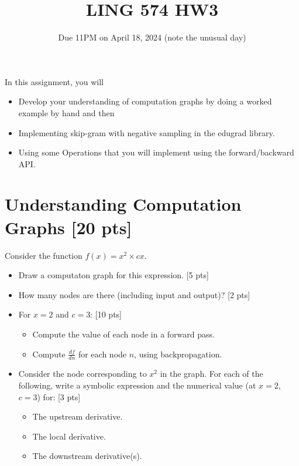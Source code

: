 \documentclass[11pt]{article}
\begin{document}
\title{LING 574 HW3}
\date{\vspace{-0.2in}Due 11PM on April 18, 2024 (note the unusual day)}
\maketitle


\noindent In this assignment, you will 
\begin{itemize}
  \item Develop your understanding of computation graphs by doing a worked example by hand and then
  \item Implementing skip-gram with negative sampling in the edugrad library.
  \item Using some Operations that you will implement using the forward/backward API.
\end{itemize}


\section{Understanding Computation Graphs [20 pts]}

  Consider the function $f(x) = x^2 \times cx$.
\begin{itemize}
  \item Draw a computaton graph for this expression. [5 pts]
  \item How many nodes are there (including input and output)? [2 pts]
  \item For $x = 2$ and $c=3$: [10 pts]
    \begin{itemize}
      \item Compute the value of each node in a forward pass.
      \item Compute $\frac{df}{dn}$ for each node $n$, using backpropagation.
    \end{itemize}
  \item Consider the node corresponding to $x^2$ in the graph.  For each of the following, write a symbolic expression and the numerical value (at $x=2$, $c=3$) for: [3 pts]
    \begin{itemize}
      \item The upstream derivative.
      \item The local derivative.
      \item The downstream derivative(s).
    \end{itemize}
\end{itemize}
\end{document}
